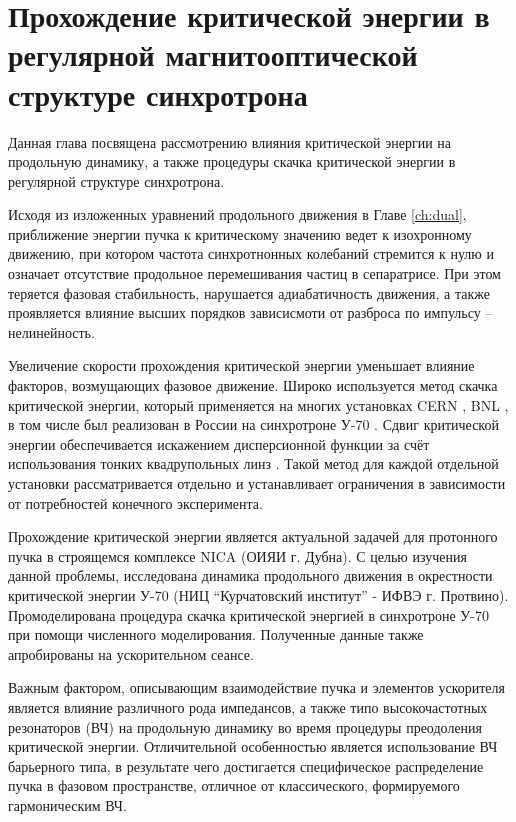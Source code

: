 
	\chapter{Прохождение критической энергии в регулярной магнитооптической структуре синхротрона}\label{ch:transition}

\par Данная глава посвящена рассмотрению влияния критической энергии на продольную динамику, а также процедуры скачка критической энергии в регулярной структуре синхротрона.

\par Исходя из изложенных уравнений продольного движения в Главе \ref{ch:dual}, приближение энергии пучка к критическому значению ведет к изохронному движению, при котором частота синхротнонных колебаний стремится к нулю и означает отсутствие продольное перемешивания частиц в сепаратрисе. При этом теряется фазовая стабильность, нарушается адиабатичность движения, а также проявляется влияние высших порядков зависисмоти от разброса по импульсу – нелинейность.

\par Увеличение скорости прохождения критической энергии уменьшает влияние факторов, возмущающих фазовое движение. Широко используется метод скачка критической энергии, который применяется на многих установках CERN \cite{risselada:jump}, BNL \cite{ainsworth:pip}, в том числе был реализован в России на синхротроне У-70 \cite{u-70}. Сдвиг критической энергии обеспечивается искажением дисперсионной функции за счёт использования тонких квадрупольных линз \cite{u-70_jump}. Такой метод для каждой отдельной установки рассматривается отдельно и устанавливает ограничения в зависимости от потребностей конечного эксперимента.

\par Прохождение критической энергии является актуальной задачей для протонного пучка в строящемся комплексе NICA (ОИЯИ г. Дубна). С целью изучения данной проблемы, исследована динамика продольного движения в окрестности критической энергии У-70 (НИЦ “Курчатовский институт” - ИФВЭ г. Протвино).  Промоделирована процедура скачка критической энергией в синхротроне У-70 при помощи численного моделирования. Полученные данные также апробированы на ускорительном сеансе. \cite{?}

\par Важным фактором, описывающим взаимодействие пучка и элементов ускорителя является влияние различного рода импедансов, а также типо высокочастотных резонаторов (ВЧ) на продольную динамику во время процедуры преодоления критической энергии. Отличительной особенностью является использование ВЧ барьерного типа, в результате чего достигается специфическое распределение пучка в фазовом пространстве, отличное от классического, формируемого гармоническим ВЧ.

